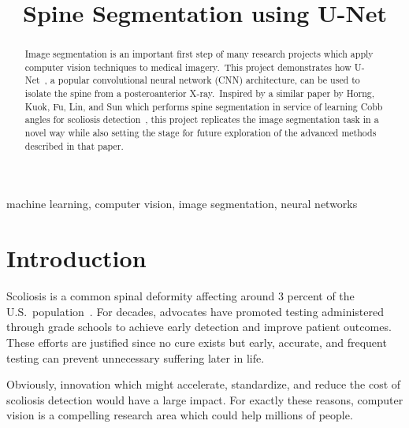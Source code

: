 \documentclass[conference]{IEEEtran}
\begin{document}
    \title{Spine Segmentation using U-Net}

    \author{
    }

    \maketitle

    \begin{abstract}
        Image segmentation is an important first step of many research projects which apply computer vision techniques to medical imagery.\ This project demonstrates how U-Net~\cite{ronneberger2015unet}, a popular convolutional neural network (CNN) architecture, can be used to isolate the spine from a posteroanterior X-ray.\ Inspired by a similar paper by Horng, Kuok, Fu, Lin, and Sun which performs spine segmentation in service of learning Cobb angles for scoliosis detection~\cite{cobb-angle-measurement-of-spine-from-x-ray-images-using-convolutional-neural-network}, this project replicates the image segmentation task in a novel way while also setting the stage for future exploration of the advanced methods described in that paper.
    \end{abstract}

    \begin{IEEEkeywords}
        machine learning, computer vision, image segmentation, neural networks
    \end{IEEEkeywords}

    \section{Introduction}\label{sec:introduction}

    Scoliosis is a common spinal deformity affecting around 3 percent of the U.S.\ population~\cite{scoliosis-media-and-community-guide}.
    For decades, advocates have promoted testing administered through grade schools to achieve early detection and improve patient outcomes.
    These efforts are justified since no cure exists but early, accurate, and frequent testing can prevent unnecessary suffering later in life.

    Obviously, innovation which might accelerate, standardize, and reduce the cost of scoliosis detection would have a large impact.
    For exactly these reasons, computer vision is a compelling research area which could help millions of people.
\end{document}
